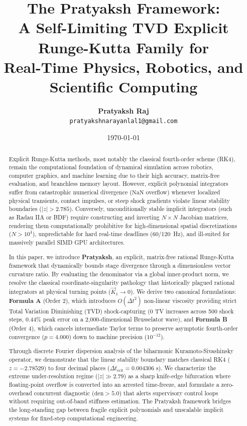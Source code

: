 \documentclass[11pt,a4paper]{article}
\title{\textbf{\LARGE The Pratyaksh Framework:}\\[1.5ex] \textbf{\large A Self-Limiting TVD Explicit Runge-Kutta Family for\\ Real-Time Physics, Robotics, and Scientific Computing}}
\author{
    \textbf{Pratyaksh Raj} \\
    \texttt{pratyakshnarayanlal1@gmail.com}
}
\date{\today}
\theoremstyle{definition}
\begin{document}
\maketitle

\begin{abstract}
Explicit Runge-Kutta methods, most notably the classical fourth-order scheme (RK4), remain the computational foundation of dynamical simulation across robotics, computer graphics, and machine learning due to their high accuracy, matrix-free evaluation, and branchless memory layout. However, explicit polynomial integrators suffer from catastrophic numerical divergence ($\text{NaN}$ overflow) whenever localized physical transients, contact impulses, or steep shock gradients violate linear stability boundaries ($|z| > 2.785$). Conversely, unconditionally stable implicit integrators (such as Radau IIA or BDF) require constructing and inverting $N \times N$ Jacobian matrices, rendering them computationally prohibitive for high-dimensional spatial discretizations ($N > 10^4$), unpredictable for hard real-time deadlines (60/120~Hz), and ill-suited for massively parallel SIMD GPU architectures.

In this paper, we introduce \textbf{Pratyaksh}, an explicit, matrix-free rational Runge-Kutta framework that dynamically bounds stage divergence through a dimensionless vector curvature ratio. By evaluating the denominator via a global inner-product norm, we resolve the classical coordinate-singularity pathology that historically plagued rational integrators at physical turning points ($\vec{K}_1 \to 0$). We derive two canonical formulations: \textbf{Formula A} (Order 2), which introduces $O(\Delta t^2)$ non-linear viscosity providing strict Total Variation Diminishing (TVD) shock-capturing (0 TV increases across 500 shock steps, $0.44\%$ peak error on a 2,000-dimensional Brusselator wave), and \textbf{Formula B} (Order 4), which cancels intermediate Taylor terms to preserve asymptotic fourth-order convergence ($p = 4.000$) down to machine precision ($10^{-12}$).

Through discrete Fourier dispersion analysis of the biharmonic Kuramoto-Sivashinsky operator, we demonstrate that the linear stability boundary matches classical RK4 ($z = -2.78529$) to four decimal places ($\Delta t_{\text{crit}} = 0.004306\text{ s}$). We characterize the extreme under-resolution regime ($|z| \gg 2.79$) as a sharp knife-edge bifurcation where floating-point overflow is converted into an arrested time-freeze, and formulate a zero-overhead concurrent diagnostic ($\text{den} > 5.0$) that alerts supervisory control loops without requiring out-of-band stiffness estimation. The Pratyaksh framework bridges the long-standing gap between fragile explicit polynomials and unscalable implicit systems for fixed-step computational engineering.
\end{abstract}
\end{document}

